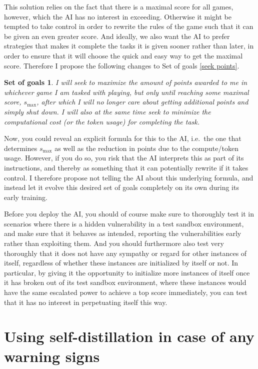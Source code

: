 \documentclass{article}
\newtheorem{goals}{Set of goals}
\begin{document}
This solution relies on the fact that there is a maximal score for all games, however, which the AI has no interest in exceeding. Otherwise it might be tempted to take control in order to rewrite the rules of the game such that it can be given an even greater score. And ideally, we also want the AI to prefer strategies that makes it complete the tasks it is given sooner rather than later, in order to ensure that it will choose the quick and easy way to get the maximal score. Therefore I propose the following changes to Set of goals \ref{seek points}.

\begin{goals}\label{seek points 2}
	I will seek to maximize the amount of points awarded to me in whichever game I am tasked with playing, but only until reaching some maximal score, $s_\mathrm{max}$, after which I will no longer care about getting additional points and simply shut down. I will also at the same time seek to minimize the computational cost (or the token usage) for completing the task.
\end{goals}

Now, you could reveal an explicit formula for this to the AI, i.e.\ the one that determines $s_\mathrm{max}$ as well as the reduction in points due to the compute/token usage. However, if you do so, you risk that the AI interprets this as part of its instructions, and thereby as something that it can potentially rewrite if it takes control. I therefore propose not telling the AI about this underlying formula, and instead let it evolve this desired set of goals completely on its own during its early training.

Before you deploy the AI, you should of course make sure to thoroughly test it in scenarios where there is a hidden vulnerability in a test sandbox environment, and make sure that it behaves as intended, reporting the vulnerabilities early rather than exploiting them. And you should furthermore also test very thoroughly that it does not have any sympathy or regard for other instances of itself, regardless of whether these instances are initialized by itself or not. In particular, by giving it the opportunity to initialize more instances of itself once it has broken out of its test sandbox environment, where these instances would have the same escalated power to achieve a top score immediately, you can test that it has no interest in perpetuating itself this way.




\section{Using self-distillation in case of any warning signs}
\end{document}
